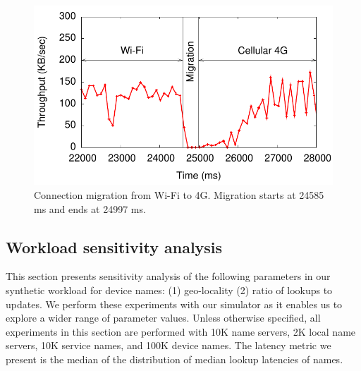 {\begin{figure}[t]
\begin{minipage}[b]{0.3\linewidth}
\centering
\includegraphics[scale=0.45]{graph/system-exp/Plot.pdf}
\caption{Connection migration from Wi-Fi to 4G. Migration starts at 24585 ms and ends at 24997 ms.}
\label{fig:mobility}
\end{minipage}
\vspace{-0.15in}
\end{figure}

}

\subsection{Workload sensitivity analysis}
\label{sec:sensitivity}


This section presents sensitivity analysis of the following parameters in our synthetic workload for device names:  
(1) geo-locality (2) ratio of  lookups to updates.
We perform these experiments with our simulator  as it enables us to explore a wider range of parameter values.  
Unless otherwise specified, all experiments in this section are performed with 10K name servers, 2K local name servers, 10K service names, and 100K device names. 
The latency metric we present is the median of the distribution of median lookup latencies of names.



